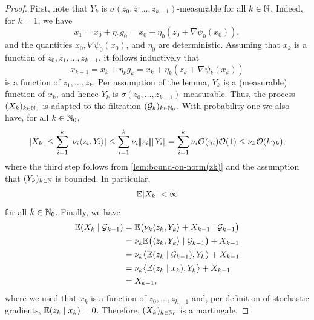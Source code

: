 \begin{proof}
    First, note that $Y_k$ is $\sigma(z_{0}, z_1 \dots, z_{k-1})$-measurable
    for all $k\in\mathbb{N}$. Indeed, for $k = 1$, we have
    \[
        x_{1} = x_0 + \eta_0 g_0 = x_0 + \eta_0 (z_0 + \nabla \psi_0(x_0)),
    \]
    and the quantities $x_0, \nabla \psi_0(x_0)$, and $\eta_0$ are deterministic. Assuming that
    $x_k$ is a function of $z_0, z_{1}, \dots, z_{k-1}$, it follows inductively that
    \[
        x_{k+1} = x_{k} + \eta_k g_k = x_{k} + \eta_k (z_k + \nabla \psi_k(x_k))
    \]
    is a function of $z_{1}, \dots, z_{k}$. Per assumption of the lemma, $Y_k$ is a (measurable)
    function of $x_k$, and hence $Y_k$ is $\sigma(z_0, \dots, z_{k-1})$-measurable.
    Thus, the process $(X_k)_{k\in\mathbb{N}_0}$
    is adapted to the filtration $(\mathcal{G}_k)_{k\in\mathbb{N}_0}$.
    With probability one we also have, for all $k\in\mathbb{N}_0$,
    \[
        |X_k|
        \leq \sum_{i=1}^k |\nu_i \langle z_i, Y_i \rangle|
        \leq \sum_{i=1}^k \nu_i |\!|z_i|\!| |\!|Y_i|\!|
        = \sum_{i=1}^k \nu_i \mathcal{O}(\gamma_i) \mathcal{O}(1) \leq \nu_k \mathcal{O}(k \gamma_k),
    \]
    where the third step follows from \cref{lem:bound-on-norm(zk)} and the assumption that
    $(Y_k)_{k\in\mathbb{N}}$ is bounded.
    In particular,
    \[
        \mathbb{E}|X_k| < \infty
    \]
    for all $k\in\mathbb{N}_0$.
    Finally, we have
    \begin{align*}
        \mathbb{E}(X_{k} \mid \mathcal{G}_{k-1})
            &= \mathbb{E}\big( \nu_k \langle z_k, Y_k \rangle + X_{k - 1} \mid \mathcal{G}_{k-1} \big) \\
            &= \nu_k \mathbb{E}\big( \langle z_k, Y_k \rangle \mid \mathcal{G}_{k-1} \big) + X_{k - 1} \\
            &= \nu_k \big\langle \mathbb{E}(z_k \mid \mathcal{G}_{k-1}), Y_k \big\rangle + X_{k - 1} \\
            &= \nu_k \big\langle \mathbb{E}(z_k \mid x_k), Y_k \big\rangle + X_{k - 1} \\
            &= X_{k - 1},
    \end{align*}
    where we used that $x_k$ is a function of $z_{0}, \dots, z_{k-1}$ and,
    per definition of stochastic gradients, $\mathbb{E}(z_k \mid x_k) = 0$.
    Therefore, $(X_k)_{k\in\mathbb{N}_0}$ is a martingale.
\end{proof}

